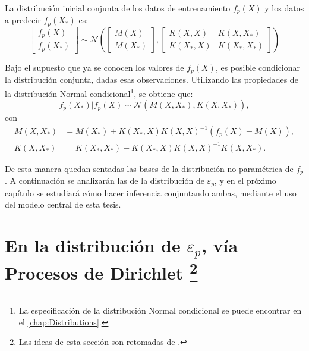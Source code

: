 La distribución inicial conjunta de los datos de entrenamiento $f_p(X)$ y los datos a predecir $f_p(X_*)$ es: 
\begin{equation*}
    \left[
        \begin{array}{c}
        f_p(X)  \\
        f_p(X_*) 
        \end{array}
    \right]  
    \sim \mathcal{N}  
    \left(
        \left[
            \begin{array}{c} 
            M(X) \\ 
            M(X_*) 
            \end{array}
        \right],
        \left[
            \begin{array}{cc}
            K(X,X) & K(X,X_*)  \\
            K(X_*,X) & K(X_*,X_*) 
            \end{array}
        \right]
    \right) 
\end{equation*}


Bajo el supuesto que ya se conocen los valores de $f_p(X)$, es posible condicionar la distribución conjunta, dadas esas observaciones. Utilizando las propiedades de la distribución Normal condicional\footnote{La especificaci\'on de la distribuci\'on Normal condicional se puede encontrar en el \autoref{chap:Distributions}.}, se obtiene que:
\begin{equation*}
    f_p(X_*)|f_p(X) 
    \sim \mathcal{N}
    (\bar{M}(X,X_*),\bar{K}(X,X_*)),
\end{equation*}
con
\begin{equation*}
\begin{aligned}
    \bar{M}(X,X_*) &= M(X_*) + K(X_*,X)K(X,X)^{-1}(f_p(X) - M(X)), \\
    \bar{K}(X,X_*) &= K(X_*,X_*) - K(X_*,X)K(X,X)^{-1}K(X,X_*).
\end{aligned}
\end{equation*}

De esta manera quedan sentadas las bases de la distribuci\'on no param\'etrica de $f_p$. A continuaci\'on se analizar\'an las de la distribuci\'on de $\varepsilon_p$, y en el pr\'oximo cap\'itulo se estudiar\'a c\'omo hacer inferencia conjuntando ambas, mediante el uso del modelo central de esta tesis.

\section[En la distribuci\'on de $\varepsilon_p$, v\'ia procesos de Dirichlet]{
    En la distribuci\'on de $\varepsilon_p$, v\'ia Procesos de Dirichlet
    \footnote{Las ideas de esta secci\'on son retomadas de \cite{Yee_DirProc}.}
}

